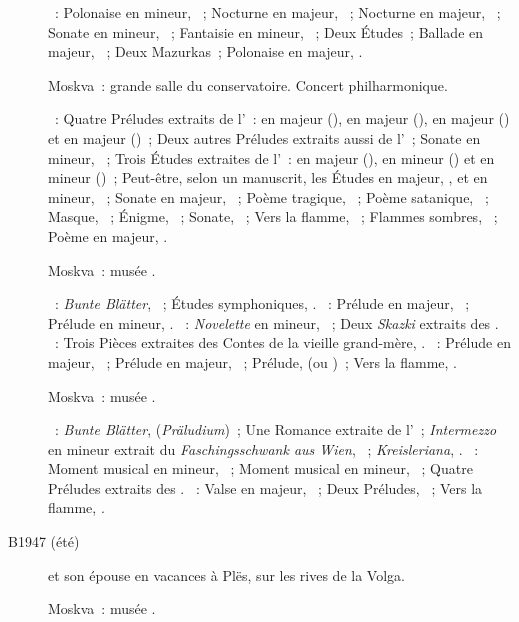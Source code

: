 \begin{description}
 \textsc{\Chopin{}}~: Polonaise en \kC \Sharp mineur,  ~;
 Nocturne en \kF \Sharp majeur,  ~; Nocturne en \kF
 majeur,  ~; Sonate en \kB \Flat mineur, ~;
 Fantaisie en \kF mineur, ~; Deux Études~; Ballade en \kA \Flat
 majeur, ~; Deux Mazurkas~; Polonaise en \kA \Flat majeur,
 .
 \item[\DateWithWeekDay{1947-05-15}]
 Moskva~: grande salle du conservatoire.
 Concert philharmonique.

 \textsc{\Scriabine{}}~: Quatre Préludes extraits de l'~: en \kB
 majeur (), en \kG \Flat majeur (), en \kD \Flat
 majeur () et en \kA \Flat majeur ()~; Deux autres
 Préludes extraits aussi de l'~; Sonate en \kF \Sharp mineur,
 ~; Trois Études extraites de l'~: en \kB majeur
 (), en \kB \Flat mineur () et en \kG \Sharp mineur
 ()~; Peut-être, selon un manuscrit, les Études en \kA \Flat
 majeur,  , et en \kD \Sharp mineur, 
 ~; Sonate en \kF \Sharp majeur, ~; Poème tragique,
 ~; Poème satanique, ~; Masque,  ~;
 Énigme,  ~; Sonate, ~; Vers la flamme,
 ~; Flammes sombres,  ~; Poème en \kF \Sharp
 majeur,  .
 \item[\DateWithWeekDay{1947-06-18}]
 Moskva~: musée \Scriabine{}.

 \textsc{\Schumann{}}~: \emph{Bunte Blätter}, ~; Études
 symphoniques, .
 \textsc{\Rachmaninov{}}~: Prélude en \kD majeur,  ~;
 Prélude en \kC mineur,  .
 \textsc{\Medtner{}}~: \emph{Novelette} en \kC mineur, 
 ~; Deux \emph{Skazki} extraits des .
 \textsc{\Prokofiev{}}~: Trois Pièces extraites des Contes de la vieille
 grand-mère, .
 \textsc{\Scriabine{}}~: Prélude en \kF \Sharp majeur, 
 ~; Prélude en \kF \Sharp majeur,  ~; Prélude,
   (ou )~; Vers la flamme, .
 \item[\DateWithWeekDay{1947-07-10}]
 Moskva~: musée \Scriabine{}.

 \textsc{\Schumann{}}~: \emph{Bunte Blätter},  
 (\emph{Präludium})~; Une Romance extraite de l'~;
 \emph{Intermezzo} en \kE \Flat mineur extrait du \emph{Faschingsschwank aus
 Wien},  ~; \emph{Kreisleriana}, .
 \textsc{\Rachmaninov{}}~: Moment musical en \kE \Flat mineur, 
 ~; Moment musical en \kB mineur,  ~; Quatre
 Préludes extraits des .
 \textsc{\Scriabine{}}~: Valse en \kA \Flat majeur, ~; Deux
 Préludes, ~; Vers la flamme, .
 \item[B1947 (été)]
 \VSofronitsky{} et son épouse \VDushinova{} en vacances à Plës, sur les
 rives de la Volga.
 \item[\DateWithWeekDay{1947-10-19}]
 Moskva~: musée \Scriabine{}.


\end{description}
